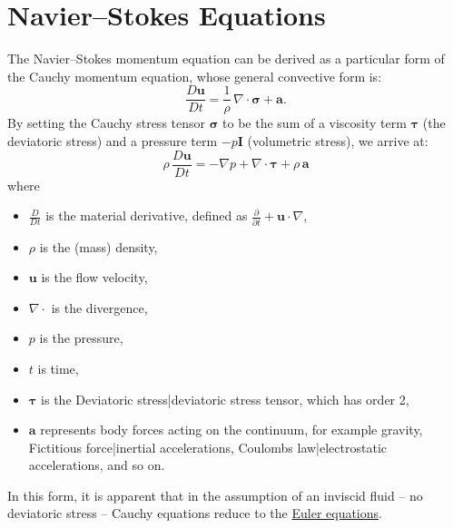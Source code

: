 \documentclass[11pt,a4paper]{article}
\begin{document}
\section*{Navier--Stokes Equations}

The Navier--Stokes momentum equation can be derived as a particular form of the Cauchy momentum equation, whose general convective form is:
\[
  \displaystyle \frac{D\mathbf{u}}{Dt} = \frac{1}{\rho}\,\nabla \cdot \boldsymbol{\sigma} + \mathbf{a}.
\]
By setting the Cauchy stress tensor $\boldsymbol{\sigma}$ to be the sum of a viscosity term $\boldsymbol{\tau}$ (the deviatoric stress) and a pressure term $-p\mathbf{I}$ (volumetric stress), we arrive at:
\[
  \displaystyle \rho\,\frac{D\mathbf{u}}{Dt} = -\nabla p + \nabla \cdot \boldsymbol{\tau} + \rho\,\mathbf{a}
\]
where
\begin{itemize}
  \item $\frac{D}{Dt}$ is the material derivative, defined as $\frac{\partial}{\partial t} + \mathbf{u} \cdot \nabla$,
  \item $\rho$ is the (mass) density,
  \item $\mathbf{u}$ is the flow velocity,
  \item $\nabla \cdot$ is the divergence,
  \item $p$ is the pressure,
  \item $t$ is time,
  \item $\boldsymbol{\tau}$ is the Deviatoric stress|deviatoric stress tensor, which has order 2,
  \item $\mathbf{a}$ represents body forces acting on the continuum, for example gravity, Fictitious force|inertial accelerations, Coulomb\textquotesingle s law|electrostatic accelerations, and so on.
\end{itemize}
In this form, it is apparent that in the assumption of an inviscid fluid -- no deviatoric stress -- Cauchy equations reduce to the \href{https://en.wikipedia.org/wiki/Euler_equations_(fluid_dynamics)}{Euler equations}.
\end{document}
